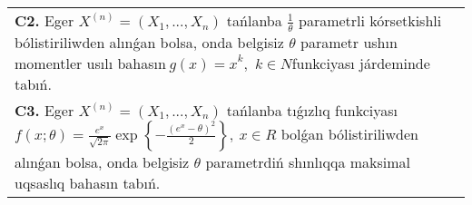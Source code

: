 \documentclass{article}
\begin{document}
\begin{tabular}{m{17cm}}
 \\
\textbf{C2.} 
Eger \(X^{(n)} = \left( X_{1},...,X_{n} \right)\) tańlanba \(\frac{1}{\theta}\) parametrli kórsetkishli bólistiriliwden alınǵan bolsa, onda belgisiz \(\theta\) parametr ushın momentler usılı bahasın\({\ g(x) = x}^{k},\) \(k \in N\)funkciyası járdeminde tabıń.
 \\
\textbf{C3.} 
Eger \(X^{(n)} = \left( X_{1},...,X_{n} \right)\) tańlanba tıǵızlıq funkciyası
$f(x;\theta) = \frac{e^{x}}{\sqrt{2\pi}}\exp\left\{ - \frac{\left( e^{x} - \theta \right)^{2}}{2} \right\},\ x \in R$
bolǵan bólistiriliwden alınǵan bolsa, onda belgisiz \(\theta\) parametrdiń shınlıqqa maksimal uqsaslıq bahasın tabıń.
 \\

\end{tabular}
\vspace{1cm}
\end{document}
